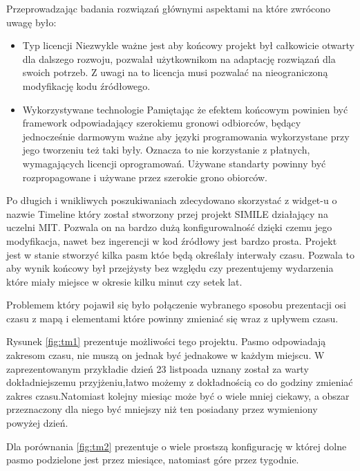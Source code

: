 Przeprowadzając badania rozwiązań głównymi aspektami na które zwrócono uwagę było:

\begin{itemize}

\item

Typ licencji
Niezwykle ważne jest aby końcowy projekt był całkowicie otwarty dla dalszego rozwoju, pozwalał użytkownikom na adaptację rozwiązań dla swoich potrzeb. Z uwagi na to licencja musi pozwalać na nieograniczoną modyfikację kodu źródłowego.

\item

Wykorzystywane technologie
Pamiętając że efektem końcowym powinien być framework odpowiadający szerokiemu gronowi odbiorców, będący jednocześnie darmowym ważne aby języki programowania wykorzystane przy jego tworzeniu też taki były. Oznacza to nie korzystanie z płatnych, wymagających licencji oprogramowań. Używane standarty powinny być rozpropagowane i używane przez szerokie grono obiorców.

\end{itemize}

Po długich i wnikliwych poszukiwaniach zdecydowano skorzystać z widget-u o nazwie Timeline który został stworzony przej projekt SIMILE działający na uczelni MIT. Pozwala on na bardzo dużą konfigurowalność dzięki czemu jego modyfikacja, nawet bez ingerencji w kod źródłowy jest bardzo prosta.
Projekt jest w stanie stworzyć kilka pasm któe będą określały interwały czasu. Pozwala to aby wynik końcowy był przejżysty bez względu czy prezentujemy wydarzenia które miały miejsce w okresie kilku minut czy setek lat.

Problemem który pojawił się było połączenie wybranego sposobu prezentacji osi czasu z mapą i elementami które powinny zmieniać się wraz z upływem czasu.

Rysunek \ref{fig:tm1} prezentuje możliwości tego projektu. Pasmo odpowiadają zakresom czasu, nie muszą on jednak być jednakowe w każdym miejscu. W zaprezentowanym przykładie dzień 23 listpoada uznany został za warty dokładniejszemu przyjżeniu,łatwo możemy z dokładnością co do godziny zmieniać zakres czasu.Natomiast kolejny miesiąc może być o wiele mniej ciekawy, a obszar przeznaczony dla niego być mniejszy niż ten posiadany przez wymieniony powyżej dzień.

Dla porównania \ref{fig:tm2} prezentuje o wiele prostszą konfigurację w której dolne pasmo podzielone jest przez miesiące, natomiast góre przez tygodnie.

